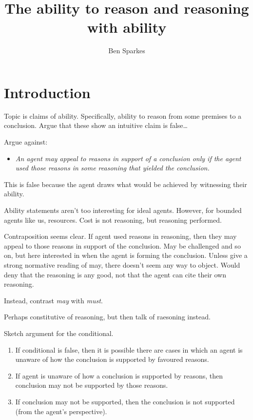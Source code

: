 \documentclass[10pt]{article}
\title{The ability to reason and reasoning with ability}
\author{Ben Sparkes}
\begin{document}


\maketitle

\section{Introduction}
\label{sec:introduction-1}


{
  \color{red}
  Topic is claims of ability.
  Specifically, ability to reason from some premises to a conclusion.
  Argue that these show an intuitive claim is false\dots
}

Argue against:
\begin{itemize}
\item\label{denied-claim} \emph{An agent may appeal to reasons in support of a conclusion only if the agent used those reasons in some reasoning that yielded the conclusion.}
\end{itemize}

{
  \color{red}
  This is false because the agent draws what would be achieved by witnessing their ability.
}

{
  \color{red}
  Ability statements aren't too interesting for ideal agents.
  However, for bounded agents like us, resources.
  Cost is not reasoning, but reasoning performed.
}

Contraposition seems clear.
If agent used reasons in reasoning, then they may appeal to those reasons in support of the conclusion.
May be challenged and so on, but here interested in when the agent is forming the conclusion.
Unless give a strong normative reading of may, there doesn't seem any way to object.
Would deny that the reasoning is any good, not that the agent can cite their own reasoning.

Instead, contrast \emph{may} with \emph{must}.

Perhaps constitutive of reasoning, but then talk of raesoning instead.

Sketch argument for the conditional.

\begin{enumerate}
\item\label{opp:sketch:1} If conditional is false, then it is possible there are cases in which an agent is unaware of how the conclusion is supported by favoured reasons.
\item\label{opp:sketch:2} If agent is unaware of how a conclusion is supported by reasons, then conclusion may not be supported by those reasons.
\item\label{opp:sketch:3} If conclusion may not be supported, then the conclusion is not supported (from the agent's perspective).
\end{enumerate}
\end{document}
